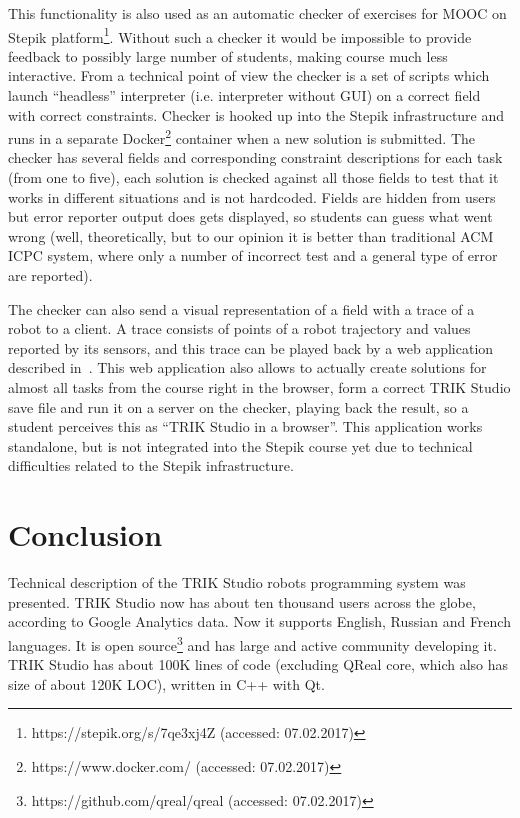 \documentclass[conference]{IEEEtran}
\begin{document}
This functionality is also used as an automatic checker of exercises for MOOC on Stepik platform\footnote{https://stepik.org/s/7qe3xj4Z (accessed: 07.02.2017)}. Without such a checker it would be impossible to provide feedback to possibly large number of students, making course much less interactive. From a technical point of view the checker is a set of scripts which launch ``headless'' interpreter (i.e. interpreter without GUI) on a correct field with correct constraints. Checker is hooked up into the Stepik infrastructure and runs in a separate Docker\footnote{https://www.docker.com/ (accessed: 07.02.2017)} container when a new solution is submitted. The checker has several fields and corresponding constraint descriptions for each task (from one to five), each solution is checked against all those fields to test that it works in different situations and is not hardcoded. Fields are hidden from users but error reporter output does gets displayed, so students can guess what went wrong (well, theoretically, but to our opinion it is better than traditional ACM ICPC system, where only a number of incorrect test and a general type of error are reported).

The checker can also send a visual representation of a field with a trace of a robot to a client. A trace consists of points of a robot trajectory and values reported by its sensors, and this trace can be played back by a web application described in~\cite{zakharov2016web}. This web application also allows to actually create solutions for almost all tasks from the course right in the browser, form a correct TRIK Studio save file and run it on a server on the checker, playing back the result, so a student perceives this as ``TRIK Studio in a browser''. This application works standalone, but is not integrated into the Stepik course yet due to technical difficulties related to the Stepik infrastructure.

\section*{Conclusion}
\label{chapter:conclusion}

Technical description of the TRIK Studio robots programming system was presented. TRIK Studio now has about ten thousand users across the globe, according to Google Analytics data. Now it supports English, Russian and French languages. It is open source\footnote{https://github.com/qreal/qreal (accessed: 07.02.2017)} and has large and active community developing it. TRIK Studio has about 100K lines of code (excluding QReal core, which also has size of about 120K LOC), written in C++ with Qt.
\end{document}
